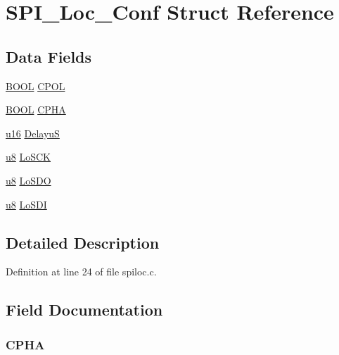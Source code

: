\hypertarget{struct_s_p_i___loc___conf}{\section{S\-P\-I\-\_\-\-Loc\-\_\-\-Conf Struct Reference}
\label{struct_s_p_i___loc___conf}
}
\subsection*{Data Fields}
\begin{DoxyCompactItemize}
\item 
\hyperlink{p8_2pinguino_2core_2typedef_8h_a67bb6a3d7ee6a2a5950ce437abbe31c8}{B\-O\-O\-L} \hyperlink{struct_s_p_i___loc___conf_ac02950660e371880e83d2ed7110e7d2f}{C\-P\-O\-L}
\item 
\hyperlink{p8_2pinguino_2core_2typedef_8h_a67bb6a3d7ee6a2a5950ce437abbe31c8}{B\-O\-O\-L} \hyperlink{struct_s_p_i___loc___conf_a0da4526584e290b715aea1513ff8f871}{C\-P\-H\-A}
\item 
\hyperlink{p8_2pinguino_2core_2typedef_8h_a50b0d1c7a54fa09a64a3ac111c778520}{u16} \hyperlink{struct_s_p_i___loc___conf_aec95f2f8e32ea5c1f1e6f84b542f0d75}{Delayu\-S}
\item 
\hyperlink{p8_2pinguino_2core_2typedef_8h_aed742c436da53c1080638ce6ef7d13de}{u8} \hyperlink{struct_s_p_i___loc___conf_aa0bdfb8b19e3ad25df14c908e5e95dc4}{Lo\-S\-C\-K}
\item 
\hyperlink{p8_2pinguino_2core_2typedef_8h_aed742c436da53c1080638ce6ef7d13de}{u8} \hyperlink{struct_s_p_i___loc___conf_ae80c6ce5d0950d1d6b0aa4d7b61c7145}{Lo\-S\-D\-O}
\item 
\hyperlink{p8_2pinguino_2core_2typedef_8h_aed742c436da53c1080638ce6ef7d13de}{u8} \hyperlink{struct_s_p_i___loc___conf_a77b28d687f22c34e34410af4b2f6fe94}{Lo\-S\-D\-I}
\end{DoxyCompactItemize}


\subsection{Detailed Description}


Definition at line 24 of file spiloc.\-c.



\subsection{Field Documentation}
\hypertarget{struct_s_p_i___loc___conf_a0da4526584e290b715aea1513ff8f871}{
\subsubsection[{C\-P\-H\-A}]{ C\-P\-H\-A}}\label{struct_s_p_i___loc___conf_a0da4526584e290b715aea1513ff8f871}


